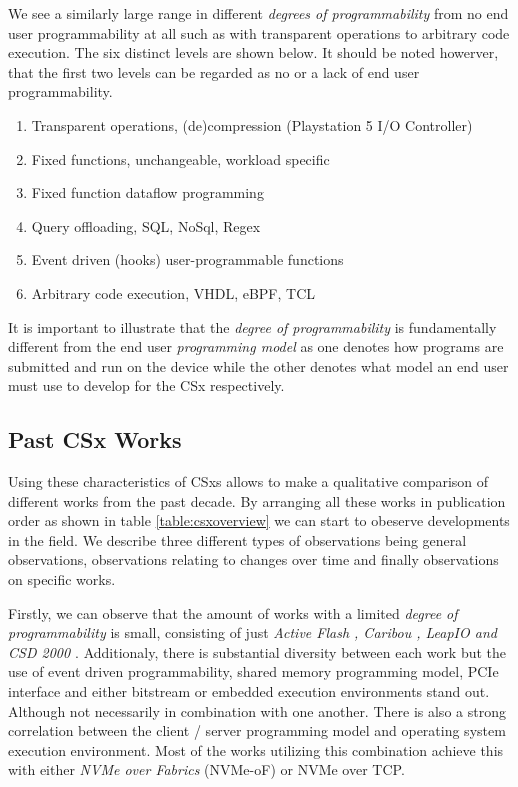 We see a similarly large range in different \textit{degrees of programmability}
from no end user programmability at all such as with transparent operations to
arbitrary code execution. The six distinct levels are shown below. It
should be noted howerver, that the first two levels can be regarded as no or a
lack of end user programmability.

\begin{enumerate}
    \item Transparent operations, (de)compression (Playstation 5 I/O Controller)
    \item Fixed functions, unchangeable, workload specific \cite{2013-fast-active-flash}
    \item Fixed function dataflow programming \cite{Wickremesinghe02distributedcomputing}
    \item Query offloading, SQL\footnotemark[3], NoSql, Regex \cite{10.14778/2994509.2994512}
    \item Event driven (hooks) user-programmable functions \cite{10.1145/3429357.3430519}
    \item Arbitrary code execution, VHDL, eBPF, TCL \cite{10.1145/605432.605425, kourtis2020safe}
\end{enumerate}


It is important to illustrate that the \textit{degree of programmability} is
fundamentally different from the end user \textit{programming model} as one
denotes how programs are submitted and run on the device while the other denotes
what model an end user must use to develop for the CSx respectively.

\subsection{Past CSx Works}

Using these characteristics of CSxs allows to make a qualitative comparison of
different works from the past decade. By arranging all these works in
publication order as shown in table \ref{table:csxoverview} we can start to
obeserve developments in the field. We describe three different types of
observations being general observations, observations relating to changes over
time and finally observations on specific works.

Firstly, we can observe that the amount of works with a limited \textit{degree
of programmability} is small, consisting of just \textit{Active Flash
\cite{active-flash-piller, 2013-fast-active-flash},
Caribou \cite{10.14778/3137628.3137632}, LeapIO \cite{10.1145/3373376.3378531}
and CSD 2000 \cite{10.1145/3399666.3399934}}. Additionaly, there is substantial
diversity between each work but the use of event driven programmability, shared
memory programming model, PCIe interface and either bitstream or embedded
execution environments stand out. Although not necessarily in combination with
one another. There is also a strong correlation between the client / server
programming model and operating system execution environment. Most of the works
utilizing this combination achieve this with either \textit{NVMe over Fabrics}
(NVMe-oF) or NVMe over TCP.

